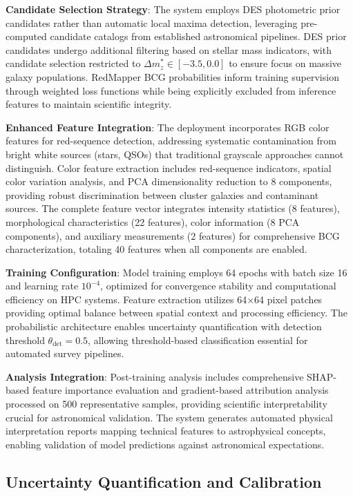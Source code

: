 \documentclass[twocolumn,10pt]{aastex631}
\begin{document}
\textbf{Candidate Selection Strategy}: The system employs DES photometric prior candidates rather than automatic local maxima detection, leveraging pre-computed candidate catalogs from established astronomical pipelines. DES prior candidates undergo additional filtering based on stellar mass indicators, with candidate selection restricted to $\Delta m^*_z \in [-3.5, 0.0]$ to ensure focus on massive galaxy populations. RedMapper BCG probabilities inform training supervision through weighted loss functions while being explicitly excluded from inference features to maintain scientific integrity.

\textbf{Enhanced Feature Integration}: The deployment incorporates RGB color features for red-sequence detection, addressing systematic contamination from bright white sources (stars, QSOs) that traditional grayscale approaches cannot distinguish. Color feature extraction includes red-sequence indicators, spatial color variation analysis, and PCA dimensionality reduction to 8 components, providing robust discrimination between cluster galaxies and contaminant sources. The complete feature vector integrates intensity statistics (8 features), morphological characteristics (22 features), color information (8 PCA components), and auxiliary measurements (2 features) for comprehensive BCG characterization, totaling 40 features when all components are enabled.

\textbf{Training Configuration}: Model training employs 64 epochs with batch size 16 and learning rate $10^{-4}$, optimized for convergence stability and computational efficiency on HPC systems. Feature extraction utilizes 64×64 pixel patches providing optimal balance between spatial context and processing efficiency. The probabilistic architecture enables uncertainty quantification with detection threshold $\theta_{\text{det}} = 0.5$, allowing threshold-based classification essential for automated survey pipelines.

\textbf{Analysis Integration}: Post-training analysis includes comprehensive SHAP-based feature importance evaluation and gradient-based attribution analysis processed on 500 representative samples, providing scientific interpretability crucial for astronomical validation. The system generates automated physical interpretation reports mapping technical features to astrophysical concepts, enabling validation of model predictions against astronomical expectations.

\subsection{Uncertainty Quantification and Calibration}
\end{document}
